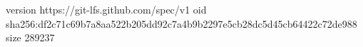 version https://git-lfs.github.com/spec/v1
oid sha256:df2c71c69b7a8aa522b205dd92c7a4b9b2297e5cb28dc5d45cb64422c72de988
size 289237
